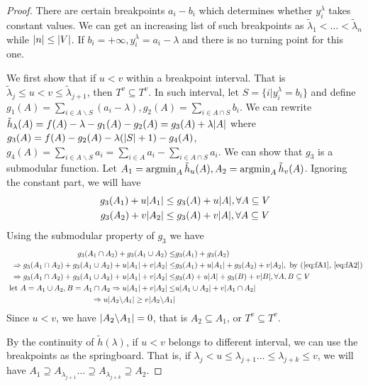 \documentclass{article}
\begin{document}
\begin{proof}
There are certain breakpoints $a_i - b_i$ which determines whether $y_i^{\lambda}$ takes constant values. We can get an increasing list of such breakpoints as $\tilde{\lambda}_1 < \dots < \tilde{\lambda}_n$ while $\lvert n\rvert\leq \lvert V\rvert$. If $b_i = +\infty, y^{\lambda}_i = a_i - \lambda$ and there is no turning point for this one.

We first show that if $ u < v $ within a breakpoint interval. That is $\tilde{\lambda}_j \leq u < v \leq \tilde{\lambda}_{j+1}$, then $T^v \subseteq T^v$. In such interval, let $S = \{i | y^{\lambda}_i = b_i\}$ and define $g_1(A) = \sum_{i\in A\backslash S} (a_i - \lambda), g_2(A)= \sum_{i \in A \cap S} b_i$. We can rewrite $\tilde{h}_{\lambda}(A) = f(A) - \lambda - g_1(A) - g_2(A) = g_3(A) + \lambda\lvert A\rvert$ where $g_3(A)=f(A)-g_2(A)-\lambda(\lvert S\rvert+1) - g_4(A)$, $g_4(A) = \sum_{i\in A\backslash S} a_i = \sum_{i \in A} a_i - \sum_{i \in A\cap S} a_i $. We can show that $g_3$ is a submodular function.
Let $A_1 = \operatorname*{argmin}_{A} \tilde{h}_u(A), A_2 = \operatorname*{argmin}_{A} \tilde{h}_v(A)$. Ignoring the constant part, we will have
\begin{align}
g_3(A_1) + u \lvert A_1\rvert& \leq g_3(A) + u \lvert A\rvert, \forall A \subseteq V \label{eq:fA1}\\
g_3(A_2) + v \lvert A_2\rvert& \leq g_3(A) + v \lvert A\rvert, \forall A \subseteq V \label{eq:fA2}
\end{align}
Using the submodular property of $g_3$ we have
\begin{align*}
g_3(A_1 \cap A_2) + g_3(A_1 \cup A_2)\leq  &g_3(A_1) + g_3(A_2) \\
\Rightarrow g_3(A_1 \cap A_2) + g_3(A_1 \cup A_2) + u \lvert A_1\rvert + v\lvert A_2\rvert 
\leq & g_3(A_1) + u \lvert A_1\rvert + g_3(A_2) + v \lvert A_2\rvert, \textrm{ by (\ref{eq:fA1}, \ref{eq:fA2})} \\
\Rightarrow g_3(A_1 \cap A_2) + g_3(A_1 \cup A_2) + u \lvert A_1\rvert + v\lvert A_2\rvert 
\leq &g_3(A) + u \lvert A\rvert+ g_3(B) + v \lvert B\rvert, \forall A, B \subseteq V \\
\textrm{ let } A =A_1 \cup A_2, B= A_1 \cap A_2 \Rightarrow u \lvert A_1\rvert + v\lvert A_2\rvert 
\leq & u \lvert A_1 \cup A_2\rvert+ v \lvert A_1\cap A_2\rvert \\
\Rightarrow u  \lvert A_2 \backslash A_1\rvert \geq v \lvert A_2 \backslash A_1\rvert
\end{align*}
Since $ u < v$, we have $\lvert A_2 \backslash A_1\rvert=0$, that is $A_2 \subseteq A_1$, or $T^v \subseteq T^v$.

By the continuity of $\tilde{h}(\lambda)$, if $u<v$ belongs to different interval, we can use the breakpoints as the springboard. That is, if $\lambda_j < u \leq \lambda_{j+1} \dots \leq \lambda_{j+k} \leq v$,  we will have $ A_1 \supseteq A_{\lambda_{j+1}} \dots \supseteq A_{\lambda_{j+k}} \supseteq A_2$.
\end{proof}
\end{document}
